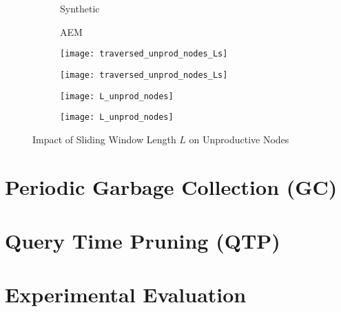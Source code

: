 \documentclass[abstracton,12pt]{scrartcl}
\theoremstyle{definition}
\begin{document}
\begin{figure}[h]
  \centering
  \begin{subfigure}{0.49\linewidth}
    \centering
    Synthetic
  \end{subfigure}
  \begin{subfigure}{0.49\linewidth}
    \centering
    AEM
  \end{subfigure}
  \begin{subfigure}{0.49\linewidth}
    \centering
    \texttt{[image: traversed\_unprod\_nodes\_Ls]}
    \caption{}
    \label{fig:trav_unprod_nodes_Ls_synthetic}
  \end{subfigure}
  \begin{subfigure}{0.49\linewidth}
    \centering
    \texttt{[image: traversed\_unprod\_nodes\_Ls]}
    \caption{}
    \label{fig:trav_unprod_nodes_Ls_aem}
  \end{subfigure}
  \begin{subfigure}{0.49\linewidth}
    \centering
    \texttt{[image: L\_unprod\_nodes]}
    \caption{}
    \label{fig:L_unprod_nodes_synthetic}
  \end{subfigure}
  \begin{subfigure}{0.49\linewidth}
    \centering
    \texttt{[image: L\_unprod\_nodes]}
    \caption{}
    \label{fig:L_unprod_nodes_aem}
  \end{subfigure}
  \caption{Impact of Sliding Window Length $L$ on Unproductive Nodes}
  \label{fig:sliding_window_length}
\end{figure}

\section{Periodic Garbage Collection (GC)}

\section{Query Time Pruning (QTP)}

\section{Experimental Evaluation}






\newpage



\end{document}
